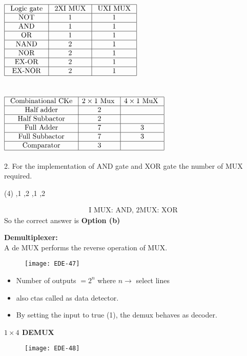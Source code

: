 $\begin{array}{|c|c|c|}
		\hline\text { Logic gate } & \text { 2XI MUX } & \text { UXI MUX } \\
	\hline \text { NOT } & 1 & 1 \\
	\hline \text { AND } & 1 & 1 \\
	\hline \text { OR } & 1 & 1 \\
	\hline \text { NAND } & 2 & 1\\
	\hline \text { NOR } & 2 & 1\\
	\hline \text { EX-OR } & 2 & 1\\
	\hline \text { EX-NOR } & 2 & 1\\	\hline
\end{array}$\\\\\\
$\begin{array}{|c|c|c|}
	\hline\text { Combinational CKe } & 2 \times 1 \text { Mux } & 4 \times 1 \text { MuX } \\
	\hline \text { Half adder } & 2 & \\
	\hline \text { Half Subbactor } & 2 & \\
	\hline \text { Full Adder } & 7 & 3\\
	\hline \text { Full Subbactor } & 7 & 3\\
		\hline \text { Comparator } & 3 &  \\\hline
\end{array}$\\\\
2. \quad For the implementation of AND gate and XOR gate the number of MUX required.
 \begin{tasks}(4)
	,1
	,2
	,1
	,2
\end{tasks}
\begin{answer}
	\begin{align*}
	\text { I MUX: AND, 2MUX: XOR }
	\end{align*}
	So the correct answer is \textbf{Option (b)}
\end{answer}
\textbf{Demultiplexer:}\\
A de MUX performs the reverse operation of MUX.
\begin{figure}[H]
	\centering
	\texttt{[image: EDE-47]}
\end{figure}
\begin{itemize}
	\item Number of outputs $=2^{n}$ where $n \rightarrow$ select lines
	\item  also ctas called as data detector.
	\item By setting the input to true (1), the demux behaves as decoder.
\end{itemize}
\textbf{$1 \times 4$ DEMUX}
\begin{figure}[H]
	\centering
	\texttt{[image: EDE-48]}
\end{figure}









